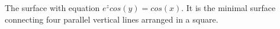  The surface with equation $e^{z}cos(y)=cos(x).$  It is
the minimal surface connecting four parallel vertical lines arranged
in a square.
